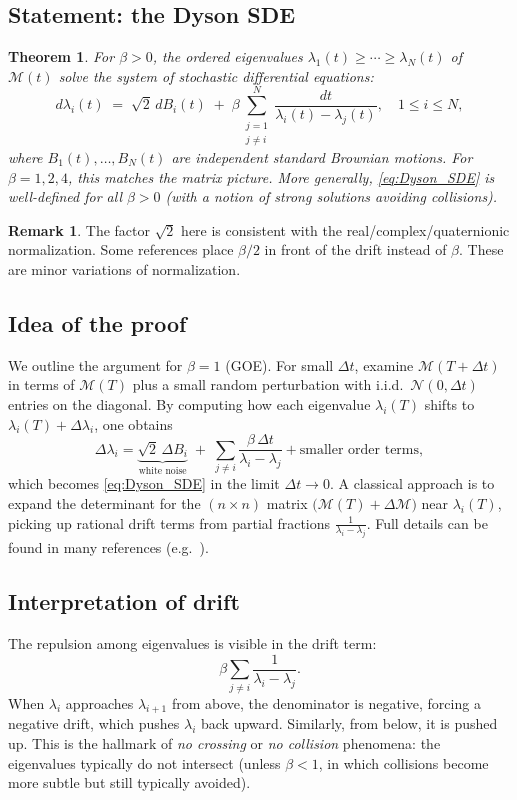 \documentclass[letterpaper,11pt,oneside,reqno]{article}
\numberwithin{equation}{section}
\newtheorem{theorem}[proposition]{Theorem}
\theoremstyle{definition}
\newtheorem{remark}[proposition]{Remark}
\begin{document}
\subsection{Statement: the Dyson SDE}
\begin{theorem}
\label{thm:Dyson_SDE}
For $\beta>0$, the ordered eigenvalues $\lambda_1(t)\ge \cdots \ge \lambda_N(t)$ of $\mathcal{M}(t)$ solve the system of stochastic differential equations:
\begin{equation}
\label{eq:Dyson_SDE}
d\lambda_i(t)\;=\;\sqrt{2}\,dB_i(t)\;+\;\beta\sum_{\substack{j=1\\j\neq i}}^{N}\frac{dt}{\lambda_i(t)-\lambda_j(t)},
\quad 1\le i \le N,
\end{equation}
where $B_1(t),\dots,B_N(t)$ are independent standard Brownian motions.
For $\beta=1,2,4$, this matches the matrix picture. More generally, \eqref{eq:Dyson_SDE} is well-defined for all $\beta>0$ (with a notion of strong solutions avoiding collisions).
\end{theorem}

\begin{remark}
The factor $\sqrt{2}$ here is consistent with the real/complex/quaternionic normalization. Some references place $\beta/2$ in front of the drift instead of $\beta$. These are minor variations of normalization.
\end{remark}

\subsection{Idea of the proof}
\label{sub:sde_proof_idea}
We outline the argument for $\beta=1$ (GOE). For small $\Delta t$, examine $\mathcal{M}(T+\Delta t)$ in terms of $\mathcal{M}(T)$ plus a small random perturbation with i.i.d.\ $\mathcal{N}(0,\Delta t)$ entries on the diagonal. By computing how each eigenvalue $\lambda_i(T)$ shifts to $\lambda_i(T)+\Delta\lambda_i$, one obtains
\[
\Delta \lambda_i = \underbrace{\sqrt{2}\,\Delta B_i}_\text{white noise} \;+\;\sum_{j\neq i}\frac{\beta \,\Delta t}{\lambda_i-\lambda_j} + \text{smaller order terms},
\]
which becomes \eqref{eq:Dyson_SDE} in the limit $\Delta t\to 0$. A classical approach is to expand the determinant for the $(n\times n)$ matrix $\bigl(\mathcal{M}(T)+\Delta\mathcal{M}\bigr)$ near $\lambda_i(T)$, picking up rational drift terms from partial fractions $\frac{1}{\lambda_i-\lambda_j}$. Full details can be found in many references (e.g.\ \cite{AndersonGuionnetZeitouni2010}).

\subsection{Interpretation of drift}
\label{sub:interpretation_drift}
The repulsion among eigenvalues is visible in the drift term:
\[
\beta\sum_{j\neq i}\frac{1}{\lambda_i-\lambda_j}.
\]
When $\lambda_i$ approaches $\lambda_{i+1}$ from above, the denominator is negative, forcing a negative drift, which pushes $\lambda_i$ back upward. Similarly, from below, it is pushed up. This is the hallmark of \emph{no crossing} or \emph{no collision} phenomena: the eigenvalues typically do not intersect (unless $\beta<1$, in which collisions become more subtle but still typically avoided).
\end{document}
